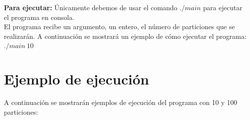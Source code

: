\documentclass[12pt]{article}
\begin{document}
\textbf{Para ejecutar:} Únicamente debemos de usar el comando $./main$ para ejecutar el programa en consola.\\
El programa recibe un argumento, un entero, el número de particiones que se realizarán. A continuación se mostrará un ejemplo de cómo ejecutar el programa:\\

$./main\ 10$

\section{Ejemplo de ejecución}

A continuación se mostrarán ejemplos de ejecución del programa con 10 y 100 particiones:\\
\end{document}
